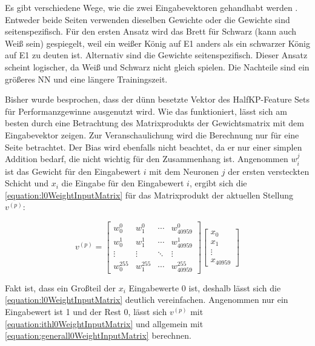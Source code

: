 Es gibt verschiedene Wege, wie die zwei Eingabevektoren gehandhabt werden \cite{StockfishNNUE}. Entweder beide Seiten verwenden dieselben Gewichte oder die Gewichte sind seitenspezifisch. Für den ersten Ansatz wird das Brett für Schwarz (kann auch Weiß sein) gespiegelt, weil ein weißer König auf E1 anders als ein schwarzer König auf E1 zu deuten ist. Alternativ sind die Gewichte seitenspezifisch. Dieser Ansatz scheint logischer, da Weiß und Schwarz nicht gleich spielen. Die Nachteile sind ein größeres \ac{NN} und eine längere Trainingszeit.

Bisher wurde besprochen, dass der dünn besetzte Vektor des HalfKP-Feature Sets für Performanzgewinne ausgenutzt wird. Wie das funktioniert, lässt sich am besten durch eine Betrachtung des Matrixprodukts der Gewichtsmatrix mit dem Eingabevektor zeigen. Zur Veranschaulichung wird die Berechnung nur für eine Seite betrachtet. Der Bias wird ebenfalls nicht beachtet, da er nur einer simplen Addition bedarf, die nicht wichtig für den Zusammenhang ist. Angenommen $w_{i}^{j}$ ist das Gewicht für den Eingabewert $i$ mit dem Neuronen $j$ der ersten versteckten Schicht und $x_{i}$ die Eingabe für den Eingabewert $i$, ergibt sich die \autoref{equation:l0WeightInputMatrix} für das Matrixprodukt der aktuellen Stellung $v^{(p)}$:

\begin{equation}
  v^{(p)} = \begin{bmatrix}
    w_{0}^{0}   & w_{1}^{0}   & \cdots & w_{40959}^{0}   \\
    w_{0}^{1}   & w_{1}^{1}   & \cdots & w_{40959}^{1}   \\
    \vdots      & \vdots      & \ddots & \vdots          \\
    w_{0}^{255} & w_{1}^{255} & \cdots & w_{40959}^{255}
  \end{bmatrix} \begin{bmatrix}
    x_{0}  \\
    x_{1}  \\
    \vdots \\
    x_{40959}
  \end{bmatrix}
  \label{equation:l0WeightInputMatrix}
\end{equation}

Fakt ist, dass ein Großteil der $x_{i}$ Eingabewerte 0 ist, deshalb lässt sich die \autoref{equation:l0WeightInputMatrix} deutlich vereinfachen. Angenommen nur ein Eingabewert ist 1 und der Rest 0, lässt sich $v^{(p)}$ mit \autoref{equation:ithl0WeightInputMatrix} und allgemein mit \autoref{equation:generall0WeightInputMatrix} berechnen.

